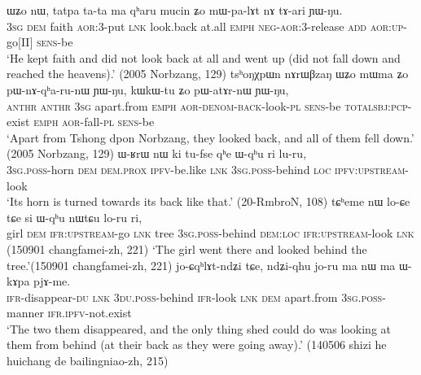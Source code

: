 \begin{exe}
\ex \label{ex:qharu2}
\begin{xlist}[(ii)]
 \label{ex:qharu.mWpalAt}
\gll  ɯʑo nɯ, tatpa ta-ta ma qʰaru mucin ʑo mɯ-pa-lɤt nɤ tɤ-ari ɲɯ-ŋu. \\
\textsc{3sg} \textsc{dem} faith \textsc{aor}:3\flobv{}-put \textsc{lnk} look.back at.all \textsc{emph} \textsc{neg}-\textsc{aor}:3\flobv{}-release \textsc{add} \textsc{aor}:\textsc{up}-go[II] \textsc{sens}-be \\
\glt `He kept faith and did not look back at all and went up (did not fall down and reached the heavens).' (2005 Norbzang, 129)
\gll  tsʰoŋχpɯn nɤrɯβzaŋ ɯʑo mɯma ʑo pɯ-nɤ-qʰa-ru-nɯ ɲɯ-ŋu, kɯ\redp{}kɯ-tu ʑo pɯ-atɤr-nɯ ɲɯ-ŋu, \\
\textsc{anthr}  \textsc{anthr} \textsc{3sg} apart.from \textsc{emph} \textsc{aor}-\textsc{denom}-\textsc{back}-look-\textsc{pl} \textsc{sens}-be \textsc{total}\redp{}\textsc{sbj}:\textsc{pcp}-exist \textsc{emph} \textsc{aor}-fall-\textsc{pl} \textsc{sens}-be \\
\glt `Apart from Tshong dpon Norbzang, they looked back, and all of them fell down.' (2005 Norbzang, 129)
 \label{ex:Wqhu.luru}
\gll ɯ-ʁrɯ nɯ ki tu-fse qʰe  ɯ-qʰu ri lu-ru,  \\
\textsc{3sg}.\textsc{poss}-horn \textsc{dem} \textsc{dem}.\textsc{prox} \textsc{ipfv}-be.like \textsc{lnk} \textsc{3sg}.\textsc{poss}-behind \textsc{loc} \textsc{ipfv}:\textsc{upstream}-look \\
\glt `Its horn is turned towards its back like that.' (20-RmbroN, 108)
 \label{ex:si.Wqhu.loru}
\gll tɕʰeme nɯ lo-ɕe tɕe si ɯ-qʰu nɯtɕu lo-ru ri, \\
girl \textsc{dem} \textsc{ifr}:\textsc{upstream}-go \textsc{lnk} tree \textsc{3sg}.\textsc{poss}-behind \textsc{dem}:\textsc{loc} \textsc{ifr}:\textsc{upstream}-look \textsc{lnk} \\
\glt (150901 changfamei-zh, 221)
\glt `The girl went there and looked behind the tree.'(150901 changfamei-zh, 221)
 \label{ex:ndZiqhu.koru}
\gll jo-ɕqʰlɤt-ndʑi tɕe, ndʑi-qhu jo-ru ma nɯ ma ɯ-kɤpa pjɤ-me. \\
\textsc{ifr}-disappear-\textsc{du} \textsc{lnk} \textsc{3du}.\textsc{poss}-behind \textsc{ifr}-look \textsc{lnk} \textsc{dem} apart.from \textsc{3sg}.\textsc{poss}-manner \textsc{ifr}.\textsc{ipfv}-not.exist \\
\glt `The two them disappeared, and the only thing shed could do was looking at them from behind  (at their back as they were going away).' (140506 shizi he huichang de bailingniao-zh, 215)
\end{xlist}
\end{exe}

